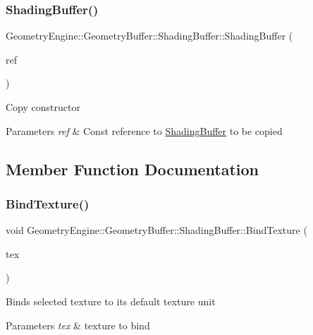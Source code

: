 \subsubsection{\texorpdfstring{ShadingBuffer()}{ShadingBuffer()}}
{\footnotesize\ttfamily Geometry\+Engine\+::\+Geometry\+Buffer\+::\+Shading\+Buffer\+::\+Shading\+Buffer (\begin{DoxyParamCaption}\item[{const \mbox{\hyperlink{class_geometry_engine_1_1_geometry_buffer_1_1_shading_buffer}{Shading\+Buffer}} \&}]{ref }\end{DoxyParamCaption})}

Copy constructor 
\begin{DoxyParams}{Parameters}
{\em ref} & Const reference to \mbox{\hyperlink{class_geometry_engine_1_1_geometry_buffer_1_1_shading_buffer}{Shading\+Buffer}} to be copied \\
\hline
\end{DoxyParams}


\subsection{Member Function Documentation}
\mbox{\label{class_geometry_engine_1_1_geometry_buffer_1_1_shading_buffer_a5c7fdd4a5e773750005956bdd923759e}} 
\subsubsection{\texorpdfstring{BindTexture()}{BindTexture()}\hspace{0.1cm}{\footnotesize\ttfamily [1/2]}}
{\footnotesize\ttfamily void Geometry\+Engine\+::\+Geometry\+Buffer\+::\+Shading\+Buffer\+::\+Bind\+Texture (\begin{DoxyParamCaption}\item[{\mbox{\hyperlink{class_geometry_engine_1_1_geometry_buffer_1_1_shading_buffer_a8047a079ff9fb9fa3400651664c92ae9}{S\+H\+A\+D\+I\+N\+G\+B\+U\+F\+F\+E\+R\+\_\+\+T\+E\+X\+T\+U\+R\+E\+\_\+\+T\+Y\+PE}}}]{tex }\end{DoxyParamCaption})}

Binds selected texture to its default texture unit 
\begin{DoxyParams}{Parameters}
{\em tex} & texture to bind \\
\hline
\end{DoxyParams}
\mbox{\label{class_geometry_engine_1_1_geometry_buffer_1_1_shading_buffer_a1122ec03dd6ffcaf19ac4370b1ef5cb8}} 
